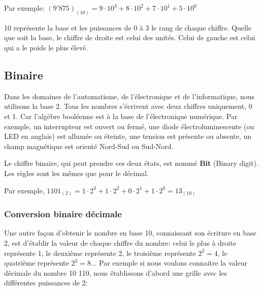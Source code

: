 \documentclass[11pt, a4paper]{book}
\begin{document}
Par exemple: $(9'875)_{(10)}=9 \cdot 10^3 + 8 \cdot 10^2 + 7\cdot 10^1 + 5 \cdot 10^0$

10 représente la base et les puissances de 0 à 3 le rang de chaque chiffre. Quelle que soit la base, le chiffre de droite est celui des unités. Celui de gauche est celui qui a le poids le plus élevé.

\subsection{Binaire}

Dans les domaines de l'automatisme, de l'électronique et de l'informatique, nous utilisons la base 2. Tous les nombres s'écrivent avec deux chiffres uniquement, 0 et 1.  Car l'algèbre booléenne est à la base de l'électronique numérique. Par exemple, un interrupteur est ouvert ou fermé, une diode électroluminescente (ou LED en anglais) est allumée ou éteinte,  une tension est présente ou absente, un champ magnétique est orienté Nord-Sud ou Sud-Nord.

Le chiffre binaire, qui peut prendre ces deux états, est nommé {\bf Bit} (Binary digit). Les règles sont les mêmes que pour le décimal. 

Par exemple, $1101_{(2)}=1 \cdot 2^3 + 1 \cdot 2^2 + 0 \cdot 2^1 + 1\cdot 2^0=13_{(10)}$ 

\subsubsection{Conversion binaire décimale}

Une autre façon d'obtenir le nombre en base 10, connaissant son écriture en base 2, est d'établir la valeur de chaque chiffre du nombre: celui le plus à droite représente 1, le deuxième représente 2, le troisième représente $2^2=4$, le quatrième représente $2^3=8$...  Par exemple si nous voulons connaitre la valeur décimale du nombre 10 110, nous établissons d'abord une grille avec les différentes puissances de 2:

\begin{center}
\end{center}
\end{document}
